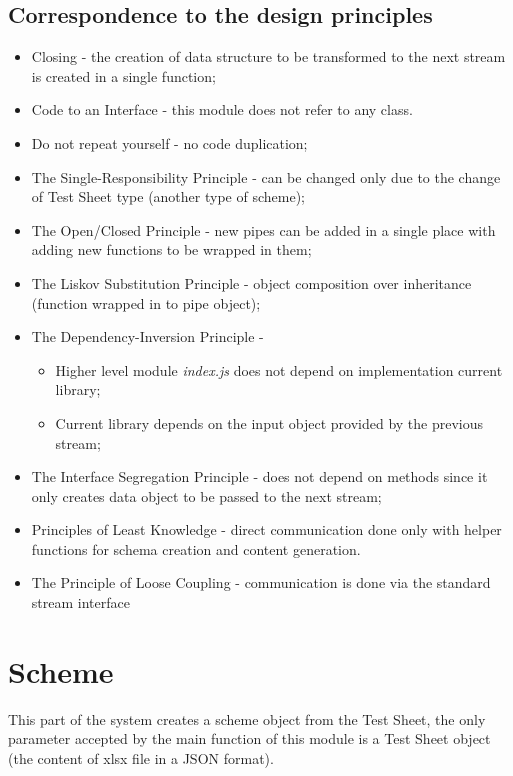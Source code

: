\subsection{Correspondence to the design principles}
\begin{itemize}
	\item Closing - the creation of data structure to be transformed to the next stream is created in a single function;
	\item Code to an Interface - this module does not refer to any class. 
	\item Do not repeat yourself - no code duplication;
	\item The Single-Responsibility Principle - can be changed only due to the change of Test Sheet type (another type of scheme);
	\item The Open/Closed Principle - new pipes can be added in a single place with adding new functions to be wrapped in them;
	\item The Liskov Substitution Principle - object composition over inheritance (function wrapped in to pipe object);
	\item The Dependency-Inversion Principle - 
				\begin{itemize}
					\item Higher level module \textit{index.js} does not depend on implementation current library;
					\item Current library depends on the input object provided by the previous stream;
				\end{itemize}
	\item The Interface Segregation Principle -  does not depend on methods since it only creates data object to be passed to the next stream;
	\item Principles of Least Knowledge - direct communication done only with helper functions for schema creation and content generation. 
	\item The Principle of Loose Coupling - communication is done via the standard stream interface
\end{itemize}


\section{Scheme}
\label{sec:scheme}
This part of the system creates a scheme object from the Test Sheet, the only parameter accepted by the main function of this module is a Test Sheet object (the content of xlsx file in a JSON format).

